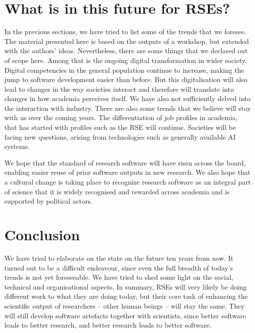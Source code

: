 \documentclass{eceasst}
\begin{document}
\section{What is in this future for RSEs?}
In the previous sections, we have tried to list some of the trends that we foresee.
The material presented here is based on the outputs of a workshop, but extended with the authors' ideas.
Nevertheless, there are some things that we declared out of scope here.
Among that is the ongoing digital transformation in wider society.
Digital competencies in the general population continue to increase,
making the jump to software development easier than before.
But this digitalisation will also lead to changes in the way societies
interact and therefore will translate into changes in how academia perceives itself.
We have also not sufficiently delved into the interaction with industry.
There are also some trends that we believe will stay with us over the coming years.
The differentiation of job profiles in academia, that has started with profiles such as the RSE will continue.
Societies will be facing new questions, arising from technologies such as generally available AI systems.

We hope that the standard of research software will have risen across the board,
enabling easier reuse of prior software outputs in new research.
We also hope that a cultural change is taking place to recognize research software
as an integral part of science that it is widely recognised and rewarded across
academia and is supported by political actors.
\section{Conclusion}
We have tried to elaborate on the state on the future ten years from now.
It turned out to be a difficult endeavour, since even the full breadth of today's trends is not yet foreseeable.
We have tried to shed some light on the social, technical and organisational aspects.
In summary, RSEs will very likely be doing different work to what they are doing today,
but their core task of enhancing the scientific output of researchers -- other human
beings -- will stay the same.
They will still develop software artefacts together with scientists,
since better software leads to better research,
and better research leads to better software.
\end{document}
